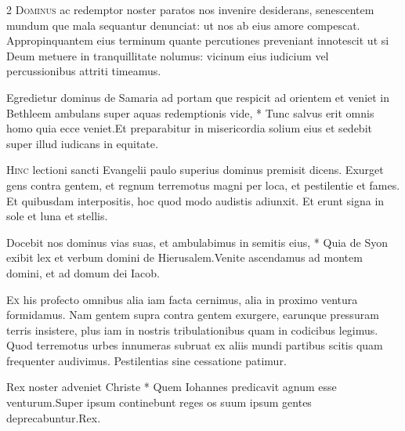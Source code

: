 \begin{multicols*}{2}
 \grecross
\lettrine[lines=2]{\zallmancaps \color{Blue} D}{ominus} ac redemptor noster paratos nos invenire desiderans, senescentem mundum que mala sequantur denunciat: ut nos ab eius amore compescat. Appropinquantem eius terminum quante percutiones preveniant innotescit ut si Deum metuere in tranquillitate nolumus: vicinum eius iudicium vel percussionibus attriti timeamus.
\begin{responsory}
{Egredietur dominus de Samaria ad portam que respicit ad orientem et veniet in Bethleem ambulans super aquas redemptionis vide, * Tunc salvus erit omnis homo quia ecce veniet.}{Et preparabitur in misericordia solium eius et sedebit super illud iudicans in equitate.}
\end{responsory}%
\lettrine[lines=2]{\zallmancaps \color{Red} H}{inc} lectioni sancti Evangelii paulo superius dominus premisit dicens. Exurget gens contra gentem, et regnum terremotus magni per loca, et pestilentie et fames. Et quibusdam interpositis, hoc quod modo audistis adiunxit. Et erunt signa in sole et luna et stellis.
\begin{responsory}
{Docebit nos dominus vias suas, et ambulabimus in semitis eius, * Quia de Syon exibit lex et verbum domini de Hierusalem.}{Venite ascendamus ad montem domini, et ad domum dei Iacob.}
\end{responsory}%
\lettrine[lines=2]{\zallmancaps \color{Blue} E}{x} his profecto omnibus alia iam facta cernimus, alia in proximo ventura formidamus. Nam gentem supra contra gentem exurgere, earunque pressuram terris insistere, plus iam in nostris tribulationibus quam in codicibus legimus. Quod terremotus urbes innumeras subruat ex aliis mundi partibus scitis quam frequenter audivimus. Pestilentias sine cessatione patimur.
\begin{responsory-doxology}
{Rex noster adveniet Christe * Quem Iohannes predicavit agnum esse venturum.}{Super ipsum continebunt reges os suum ipsum gentes deprecabuntur.}Rex.
\end{responsory-doxology}%

\end{multicols*}
